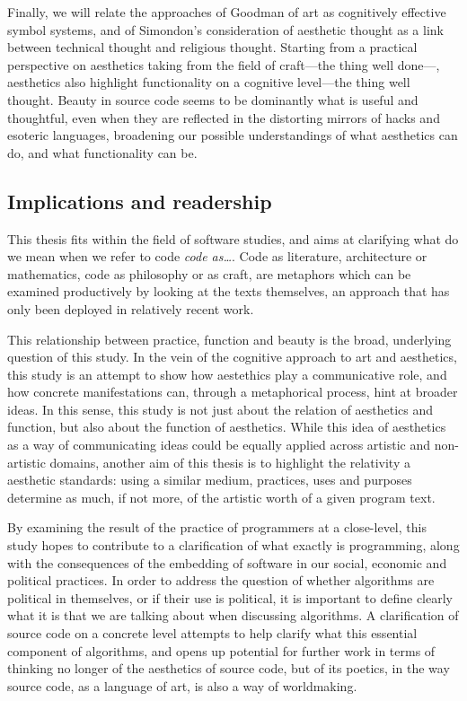 Finally, we will relate the approaches of Goodman of art as cognitively effective symbol systems, and of Simondon's consideration of aesthetic thought as a link between technical thought and religious thought. Starting from a practical perspective on aesthetics taking from the field of craft—the thing well done—, aesthetics also highlight functionality on a cognitive level—the thing well thought. Beauty in source code seems to be dominantly what is useful and thoughtful, even when they are reflected in the distorting mirrors of hacks and esoteric languages, broadening our possible understandings of what aesthetics can do, and what functionality can be.

\subsection{Implications and readership}

This thesis fits within the field of software studies, and aims at clarifying what do we mean when we refer to code \emph{code as\dots}. Code as literature, architecture or mathematics, code as philosophy or as craft, are metaphors which can be examined productively by looking at the texts themselves, an approach that has only been deployed in relatively recent work.

This relationship between practice, function and beauty is the broad, underlying question of this study. In the vein of the cognitive approach to art and aesthetics, this study is an attempt to show how aestethics play a communicative role, and how concrete manifestations can, through a metaphorical process, hint at broader ideas. In this sense, this study is not just about the relation of aesthetics and function, but also about the function of aesthetics. While this idea of aesthetics as a way of communicating ideas could be equally applied across artistic and non-artistic domains, another aim of this thesis is to highlight the relativity a aesthetic standards: using a similar medium, practices, uses and purposes determine as much, if not more, of the artistic worth of a given program text.

By examining the result of the practice of programmers at a close-level, this study hopes to contribute to a clarification of what exactly is programming, along with the consequences of the embedding of software in our social, economic and political practices. In order to address the question of whether algorithms are political in themselves, or if their use is political, it is important to define clearly what it is that we are talking about when discussing algorithms. A clarification of source code on a concrete level attempts to help clarify what this essential component of algorithms, and opens up potential for further work in terms of thinking no longer of the aesthetics of source code, but of its poetics, in the way source code, as a language of art, is also a way of worldmaking.


